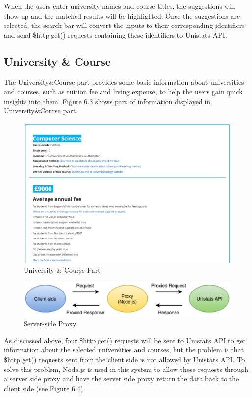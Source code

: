 When the users enter university names and course titles, the suggestions will show up and the matched results will be highlighted. Once the suggestions are selected, the search bar will convert the inputs to their corresponding identifiers and send \$http.get() requests containing these identifiers to Unistats API. 

\subsection{University \& Course}

The University\&Course part provides some basic information about universities and courses, such as tuition fee and living expense, to help the users gain quick insights into them. Figure 6.3 shows part of information displayed in University\&Course part. 

\begin{figure}[H]
  \centering
  \includegraphics[width=15cm]{./img/Picture18}
  \caption{University \& Course Part}
  \label{Figure:figex}
\end{figure}


\begin{figure}[H]
  \centering
  \includegraphics[width=12cm]{./img/Picture19}
  \caption{Server-side Proxy
}
  \label{Figure:figex}
\end{figure}

As discussed above, four \$http.get() requests will be sent to Unistats API to get information about the selected universities and courses, but the problem is that \$http.get() requests sent from the client side is not allowed by Unistats API. To solve this problem, Node.js is used in this system to allow these requests through a server side proxy and have the server side proxy return the data back to the client side (see Figure 6.4).


